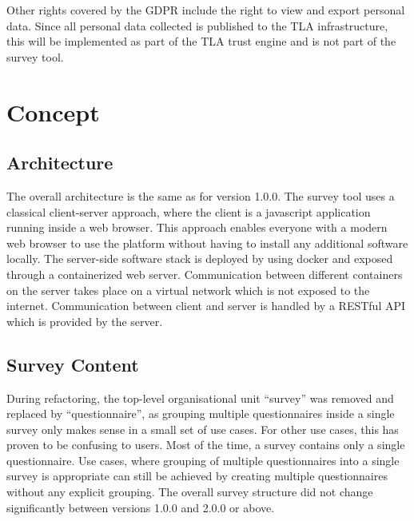 \documentclass[a4paper,11pt]{article}
\begin{document}
            Other rights covered by the GDPR include the right to view and export personal data.
            Since all personal data collected is published to the TLA infrastructure,
            this will be implemented as part of the TLA trust engine and is not
            part of the survey tool.


        \section{Concept}

            \subsection{Architecture}
                The overall architecture is the same as for version 1.0.0. The survey tool
                uses a classical client-server approach, where the client is a 
                javascript application running inside a web browser. This approach
                enables everyone with a modern web browser to use the platform without
                having to install any additional software locally. The server-side software stack
                is deployed by using docker and exposed through a containerized web server.
                Communication between different containers on the server takes place
                on a virtual network which is not exposed to the internet. Communication
                between client and server is handled by a RESTful API which is provided
                by the server.

            \subsection{Survey Content}
                During refactoring, the top-level organisational unit ``survey'' was removed
                and replaced by ``questionnaire'', as grouping multiple questionnaires
                inside a single survey only makes sense in a small set of use cases.
                For other use cases, this has proven to be confusing to users. Most of the time, 
                a survey contains only a single questionnaire. Use cases, where
                grouping of multiple questionnaires into a single survey is appropriate
                can still be achieved by creating multiple questionnaires without any
                explicit grouping. The overall survey structure did not change significantly
                between versions 1.0.0 and 2.0.0 or above.
\end{document}
